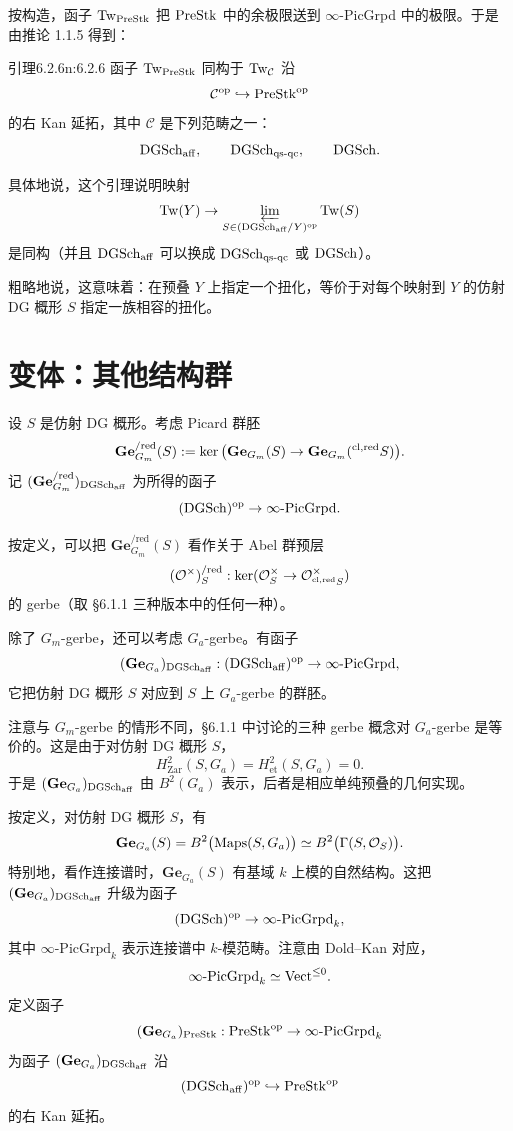 按构造，函子 $\mathrm{Tw}_{\mathrm{PreStk}}$ 把 $\mathrm{PreStk}$ 中的余极限送到 $\infty$-PicGrpd 中的极限。于是由推论 1.1.5 得到：

\begin{othm}{引理}{6.2.6}{n:6.2.6}
函子 $\mathrm{Tw}_{\mathrm{PreStk}}$ 同构于 $\mathrm{Tw}_{\mathcal{C}}$ 沿
\[
\mathcal{C}^{\mathrm{op}}\hookrightarrow\mathrm{PreStk}^{\mathrm{op}}
\]
的右 Kan 延拓，其中 $\mathcal{C}$ 是下列范畴之一：
\[
\mathrm{DGSch}_{\mathrm{aff}},\qquad \mathrm{DGSch}_{\mathrm{qs\text{-}qc}},\qquad \mathrm{DGSch}.
\]
\end{othm}

具体地说，这个引理说明映射
\[
\mathrm{Tw}(Y)\to\varprojlim_{S\in(\mathrm{DGSch}_{\mathrm{aff}}/Y)^{\mathrm{op}}}\mathrm{Tw}(S)
\]
是同构（并且 $\mathrm{DGSch}_{\mathrm{aff}}$ 可以换成 $\mathrm{DGSch}_{\mathrm{qs\text{-}qc}}$ 或 $\mathrm{DGSch}$）。

粗略地说，这意味着：在预叠 $Y$ 上指定一个扭化，等价于对每个映射到 $Y$ 的仿射 DG 概形 $S$ 指定一族相容的扭化。

\section{变体：其他结构群}

设 $S$ 是仿射 DG 概形。考虑 Picard 群胚
\[
\mathbf{Ge}^{/\mathrm{red}}_{G_m}(S):=\ker\big(\mathbf{Ge}_{G_m}(S)\to\mathbf{Ge}_{G_m}(^{\mathrm{cl,red}} S)\big).
\]
记 $(\mathbf{Ge}^{/\mathrm{red}}_{G_m})_{\mathrm{DGSch}_{\mathrm{aff}}}$ 为所得的函子
\[
(\mathrm{DGSch})^{\mathrm{op}}\to\infty\text{-}\mathrm{PicGrpd}.
\]

按定义，可以把 $\mathbf{Ge}^{/\mathrm{red}}_{G_m}(S)$ 看作关于 Abel 群预层
\[
(\mathcal{O}^{\times})^{/\mathrm{red}}_S:\ker(\mathcal{O}^{\times}_S\to\mathcal{O}^{\times}_{^{\mathrm{cl,red}} S})
\]
的 gerbe（取 §6.1.1 三种版本中的任何一种）。

除了 $G_m$-gerbe，还可以考虑 $G_a$-gerbe。有函子
\[
(\mathbf{Ge}_{G_a})_{\mathrm{DGSch}_{\mathrm{aff}}}:(\mathrm{DGSch}_{\mathrm{aff}})^{\mathrm{op}}\to\infty\text{-}\mathrm{PicGrpd},
\]
它把仿射 DG 概形 $S$ 对应到 $S$ 上 $G_a$-gerbe 的群胚。

注意与 $G_m$-gerbe 的情形不同，§6.1.1 中讨论的三种 gerbe 概念对 $G_a$-gerbe 是等价的。这是由于对仿射 DG 概形 $S$，
\[
H^2_{\mathrm{Zar}}(S,G_a)=H^2_{\mathrm{et}}(S,G_a)=0.
\]
于是 $(\mathbf{Ge}_{G_a})_{\mathrm{DGSch}_{\mathrm{aff}}}$ 由 $B^2(G_a)$ 表示，后者是相应单纯预叠的几何实现。

按定义，对仿射 DG 概形 $S$，有
\[
\mathbf{Ge}_{G_a}(S)=B^2\big(\mathrm{Maps}(S,G_a)\big)\simeq B^2\big(\Gamma(S,\mathcal{O}_S)\big).
\]
特别地，看作连接谱时，$\mathbf{Ge}_{G_a}(S)$ 有基域 $k$ 上模的自然结构。这把 $(\mathbf{Ge}_{G_a})_{\mathrm{DGSch}_{\mathrm{aff}}}$ 升级为函子
\[
(\mathrm{DGSch})^{\mathrm{op}}\to\infty\text{-}\mathrm{PicGrpd}_k,
\]
其中 $\infty\text{-}\mathrm{PicGrpd}_k$ 表示连接谱中 $k$-模范畴。注意由 Dold--Kan 对应，
\[
\infty\text{-}\mathrm{PicGrpd}_k\simeq\mathrm{Vect}^{\leq 0}.
\]
定义函子
\[
(\mathbf{Ge}_{G_a})_{\mathrm{PreStk}}:\mathrm{PreStk}^{\mathrm{op}}\to\infty\text{-}\mathrm{PicGrpd}_k
\]
为函子 $(\mathbf{Ge}_{G_a})_{\mathrm{DGSch}_{\mathrm{aff}}}$ 沿
\[
(\mathrm{DGSch}_{\mathrm{aff}})^{\mathrm{op}}\hookrightarrow\mathrm{PreStk}^{\mathrm{op}}
\]
的右 Kan 延拓。


